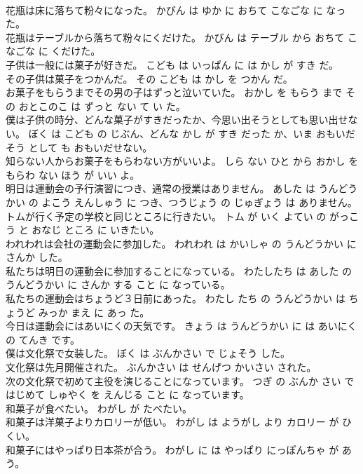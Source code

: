 \documentclass[8pt]{extreport}
\begin{document}
\begin{CJK}{UTF8}{min}
\\	花瓶は床に落ちて粉々になった。	かびん は ゆか に おちて こなごな に なった。	
\\	花瓶はテーブルから落ちて粉々にくだけた。	かびん は テーブル から おちて こなごな に くだけた。	
\\	子供は一般には菓子が好きだ。	こども は いっぱん に は かし が すき だ。	
\\	その子供は菓子をつかんだ。	その こども は かし を つかん だ。	
\\	お菓子をもらうまでその男の子はずっと泣いていた。	おかし を もらう まで その おとこのこ は ずっと ない て い た。	
\\	僕は子供の時分、どんな菓子がすきだったか、今思い出そうとしても思い出せない。	ぼく は こども の じぶん、どんな かし が すき だった か、いま おもいだそう として も おもいだせない。	
\\	知らない人からお菓子をもらわない方がいいよ。	しら ない ひと から おかし を もらわ ない ほう が いい よ。	
\\	明日は運動会の予行演習につき、通常の授業はありません。	あした は うんどうかい の よこう えんしゅう に つき、つうじょう の じゅぎょう は ありません。	
\\	トムが行く予定の学校と同じところに行きたい。	トム が いく よてい の がっこう と おなじ ところ に いきたい。	
\\	われわれは会社の運動会に参加した。	われわれ は かいしゃ の うんどうかい に さんか した。	
\\	私たちは明日の運動会に参加することになっている。	わたしたち は あした の うんどうかい に さんか する こと に なっている。	
\\	私たちの運動会はちょうど３日前にあった。	わたし たち の うんどうかい は ちょうど みっか まえ に あっ た。	
\\	今日は運動会にはあいにくの天気です。	きょう は うんどうかい に は あいにく の てんき です。	
\\	僕は文化祭で女装した。	ぼく は ぶんかさい で じょそう した。	
\\	文化祭は先月開催された。	ぶんかさい は せんげつ かいさい された。	
\\	次の文化祭で初めて主役を演じることになっています。	つぎ の ぶんか さい で はじめて しゅやく を えんじる こと に なっています。	
\\	和菓子が食べたい。	わがし が たべたい。	
\\	和菓子は洋菓子よりカロリーが低い。	わがし は ようがし より カロリー が ひくい。	
\\	和菓子にはやっぱり日本茶が合う。	わがし に は やっぱり にっぽんちゃ が あう。	

\end{CJK}
\end{document}
